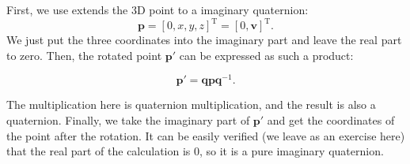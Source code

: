 First, we use extends the 3D point to a imaginary quaternion:
\[
\bm{p} = [0, x, y, z]^\mathrm{T} = [0, \bm{v}]^\mathrm{T}. 
\]
We just put the three coordinates into the imaginary part and leave the real part to zero. Then, the rotated point $ \bm {p}' $ can be expressed as such a product:

\begin{equation}\label{eq:rotate-with-quaternion}
\bm{p}' = \bm{q} \bm{p} \bm{q}^{-1}.
\end{equation}

The multiplication here is quaternion multiplication, and the result is also a quaternion. Finally, we take the imaginary part of $ \bm{p}' $ and get the coordinates of the point after the rotation. It can be easily verified (we leave as an exercise here) that the real part of the calculation is 0, so it is a pure imaginary quaternion.

